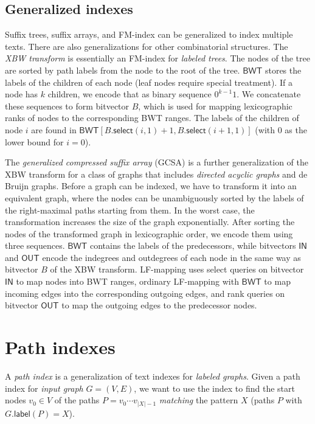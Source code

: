\documentclass[a4paper,UKenglish]{lipics-v2016}
\newcommand{\abs}[1]{\ensuremath{\lvert #1 \rvert}}
\newcommand{\select}{\ensuremath{\mathsf{select}}}
\newcommand{\glabel}{\ensuremath{\mathsf{label}}}
\newcommand{\LFmapping}{LF\nobreakdash-mapping}
\newcommand{\FMindex}{FM\nobreakdash-index}
\newcommand{\BWT}{\ensuremath{\mathsf{BWT}}}
\newcommand{\bvIN}{\ensuremath{\mathsf{IN}}}
\newcommand{\bvOUT}{\ensuremath{\mathsf{OUT}}}
\begin{document}
\subsection{Generalized indexes}

Suffix trees, suffix arrays, and \FMindex{} can be generalized to index multiple texts. There are also generalizations for other combinatorial structures. The \emph{XBW transform} \cite{Ferragina2009b} is essentially an \FMindex{} for \emph{labeled trees}. The nodes of the tree are sorted by path labels from the node to the root of the tree. $\BWT$ stores the labels of the children of each node (leaf nodes require special treatment). If a node has $k$ children, we encode that as binary sequence $0^{k-1} 1$. We concatenate these sequences to form bitvector $B$, which is used for mapping lexicographic ranks of nodes to the corresponding BWT ranges. The labels of the children of node $i$ are found in $\BWT[B.\select(i, 1) + 1, B.\select(i + 1, 1)]$ (with $0$ as the lower bound for $i = 0$).

The \emph{generalized compressed suffix array} (GCSA) \cite{Siren2014} is a further generalization of the XBW transform for a class of graphs that includes \emph{directed acyclic graphs} and de Bruijn graphs. Before a graph can be indexed, we have to transform it into an equivalent graph, where the nodes can be unambiguously sorted by the labels of the right-maximal paths starting from them. In the worst case, the transformation increases the size of the graph exponentially. After sorting the nodes of the transformed graph in lexicographic order, we encode them using three sequences. $\BWT$ contains the labels of the predecessors, while bitvectors $\bvIN$ and $\bvOUT$ encode the indegrees and outdegrees of each node in the same way as bitvector $B$ of the XBW transform. \LFmapping{} uses select queries on bitvector $\bvIN$ to map nodes into BWT ranges, ordinary \LFmapping{} with $\BWT$ to map incoming edges into the corresponding outgoing edges, and rank queries on bitvector $\bvOUT$ to map the outgoing edges to the predecessor nodes.


\section{Path indexes}\label{sect:path-indexes}

A \emph{path index} is a generalization of text indexes for \emph{labeled graphs}. Given a path index for \emph{input graph} $G = (V, E)$, we want to use the index to find the start nodes $v_{0} \in V$ of the paths $P = v_{0} \dotsm v_{\abs{X}-1}$ \emph{matching} the pattern $X$ (paths $P$ with $G.\glabel(P) = X$).
\end{document}

